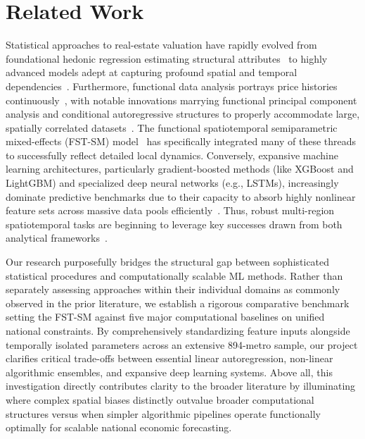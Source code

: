 \documentclass[runningheads]{llncs}
\begin{document}
\section{Related Work}
\label{sec:related}

Statistical approaches to real-estate valuation have rapidly evolved from foundational hedonic regression estimating structural attributes~\cite{ref_rosen} to highly advanced models adept at capturing profound spatial and temporal dependencies~\cite{ref_anselin,ref_pijnenburg}. Furthermore, functional data analysis portrays price histories continuously~\cite{ref_ramsay_2002}, with notable innovations marrying functional principal component analysis and conditional autoregressive structures to properly accommodate large, spatially correlated datasets~\cite{ref_zhang_fcar,ref_li_guan2014}. The functional spatiotemporal semiparametric mixed-effects (FST-SM) model~\cite{ref_fmem2023} has specifically integrated many of these threads to successfully reflect detailed local dynamics. Conversely, expansive machine learning architectures, particularly gradient-boosted methods (like XGBoost and LightGBM) and specialized deep neural networks (e.g., LSTMs), increasingly dominate predictive benchmarks due to their capacity to absorb highly nonlinear feature sets across massive data pools efficiently~\cite{ref_ho2021,ref_fan2022,ref_shi2023}. Thus, robust multi-region spatiotemporal tasks are beginning to leverage key successes drawn from both analytical frameworks~\cite{ref_lee2022,ref_samal2022}.

Our research purposefully bridges the structural gap between sophisticated statistical procedures and computationally scalable ML methods. Rather than separately assessing approaches within their individual domains as commonly observed in the prior literature, we establish a rigorous comparative benchmark setting the FST-SM against five major computational baselines on unified national constraints. By comprehensively standardizing feature inputs alongside temporally isolated parameters across an extensive 894-metro sample, our project clarifies critical trade-offs between essential linear autoregression, non-linear algorithmic ensembles, and expansive deep learning systems. Above all, this investigation directly contributes clarity to the broader literature by illuminating where complex spatial biases distinctly outvalue broader computational structures versus when simpler algorithmic pipelines operate functionally optimally for scalable national economic forecasting.
\end{document}
